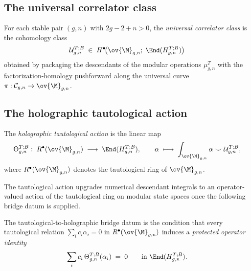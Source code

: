 \subsection{The universal correlator class}
\label{subsec:universal-correlator-class}

\begin{definition}
\label{def:universal-correlator-class}
For each stable pair $(g,n)$ with $2g-2+n > 0$, the \emph{universal correlator class} is
the cohomology class
\begin{equation}
\label{eq:universal-correlator-class}
\mathcal{U}_{g,n}^{T;B}
\;\in\;
H^\bullet\!\bigl(\ov{\M}_{g,n};\;\End(H_{g,n}^{T;B})\bigr)
\end{equation}
obtained by packaging the descendants of the modular operations $\mu_{g,n}^T$ with the
factorization-homology pushforward along the universal curve
$\pi: \mathcal{C}_{g,n} \to \ov{\M}_{g,n}$.
\end{definition}

\subsection{The holographic tautological action}
\label{subsec:holographic-tautological-action}

\begin{definition}
\label{def:holographic-tautological-action}
The \emph{holographic tautological action} is the linear map
\begin{equation}
\label{eq:tautological-action}
\Theta_{g,n}^{T;B}:\;
R^\bullet(\ov{\M}_{g,n})
\;\longrightarrow\;
\End(H_{g,n}^{T;B}),
\qquad
\alpha \;\longmapsto\;
\int_{\ov{\M}_{g,n}} \alpha \smile \mathcal{U}_{g,n}^{T;B},
\end{equation}
where $R^\bullet(\ov{\M}_{g,n})$ denotes the tautological ring of $\ov{\M}_{g,n}$.
\end{definition}

The tautological action upgrades numerical descendant integrals to an
operator-valued action of the tautological ring on modular state spaces
once the following bridge datum is supplied.

\begin{definition}
\label{def:tautological-holographic-bridge}
The tautological-to-holographic bridge datum is the condition that
every tautological relation $\sum_i c_i \alpha_i = 0$ in $R^\bullet(\ov{\M}_{g,n})$
induces a \emph{protected operator identity}
\[
\sum_i c_i\,\Theta_{g,n}^{T;B}(\alpha_i) \;=\; 0
\qquad \text{in } \End(H_{g,n}^{T;B}).
\]
\end{definition}

